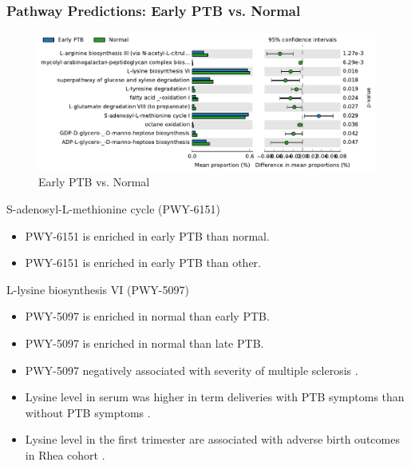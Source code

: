 \documentclass{beamer}
\begin{document}
    \begin{frame}[allowframebreaks]
        \frametitle{Pathway Predictions: Early PTB vs. Normal}

        \begin{figure}
            \includegraphics[width=0.9 \linewidth]{figures/PICRUSt2/EF.pdf}
            \caption{Early PTB vs. Normal}
        \end{figure}

        \begin{block}{S-adenosyl-L-methionine cycle (PWY-6151)}
            \begin{itemize}
                \item PWY-6151 is enriched in early PTB than normal.
                \item PWY-6151 is enriched in early PTB than other.
            \end{itemize}
        \end{block}

        \begin{block}{L-lysine biosynthesis VI (PWY-5097)}
            \begin{itemize}
                \item PWY-5097 is enriched in normal than early PTB.
                \item PWY-5097 is enriched in normal than late PTB.
                \item PWY-5097 negatively associated with severity of multiple sclerosis \cite{PWY-5097-1}.
                \item Lysine level in serum was higher in term deliveries with PTB symptoms than without PTB symptoms \cite{PWY-5097-2}.
                \item Lysine level in the first trimester are associated with adverse birth outcomes in Rhea cohort \cite{PWY-5097-3}.
            \end{itemize}
        \end{block}


\end{frame}
\end{document}
